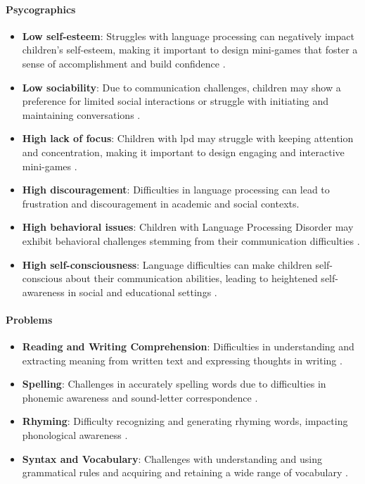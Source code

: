 \paragraph{Psycographics}
\begin{itemize}
    \item \textbf{Low self-esteem}: Struggles with language processing can negatively impact children's self-esteem, making it important to design mini-games that foster a sense of accomplishment and build confidence \cite{vanderbilt}.
    \item \textbf{Low sociability}: Due to communication challenges, children may show a preference for limited social interactions or struggle with initiating and maintaining conversations \cite{greatspeech}.
    \item \textbf{High lack of focus}: Children with \gls{lpd} may struggle with keeping attention and concentration, making it important to design engaging and interactive mini-games \cite{vanderbilt}.
    \item \textbf{High discouragement}: Difficulties in language processing can lead to frustration and discouragement in academic and social contexts.
    \item \textbf{High behavioral issues}: Children with Language Processing Disorder may exhibit behavioral challenges stemming from their communication difficulties \cite{vanderbilt}.
    \item \textbf{High self-consciousness}: Language difficulties can make children self-conscious about their communication abilities, leading to heightened self-awareness in social and educational settings \cite{additude}.
\end{itemize}

\paragraph{Problems}
\begin{itemize}
    \item \textbf{Reading and Writing Comprehension}: Difficulties in understanding and extracting meaning from written text and expressing thoughts in writing \cite{vanderbilt}.
    \item \textbf{Spelling}: Challenges in accurately spelling words due to difficulties in phonemic awareness and sound-letter correspondence \cite{vanderbilt}.
    \item \textbf{Rhyming}: Difficulty recognizing and generating rhyming words, impacting phonological awareness \cite{vanderbilt}.
    \item \textbf{Syntax and Vocabulary}: Challenges with understanding and using grammatical rules and acquiring and retaining a wide range of vocabulary \cite{additude}.
\end{itemize}

